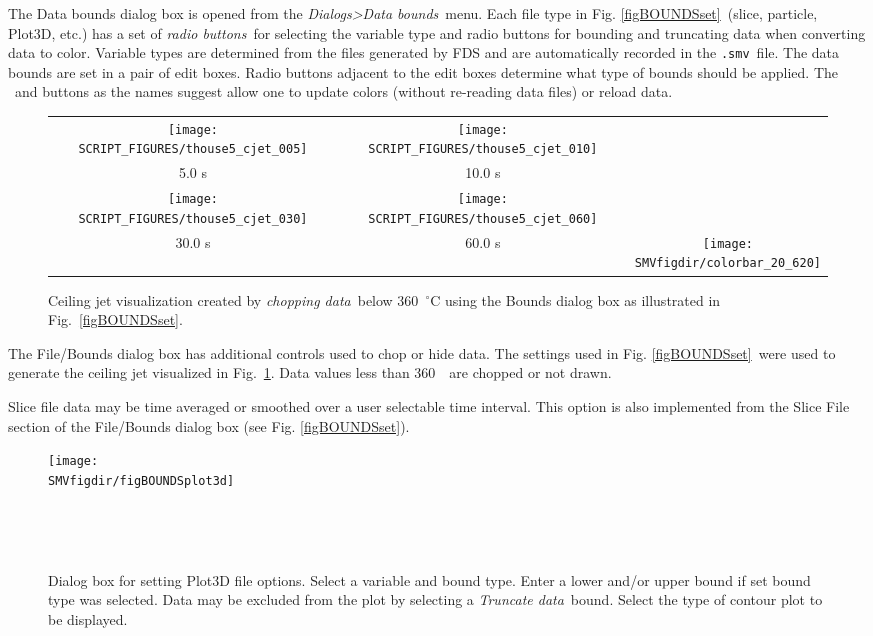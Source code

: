\documentclass[11pt,twoside]{book}
\newcommand{\figheightAbar}{2.2in}
\newcommand{\frameit}[1]{\fbox{\tt #1}}
\begin{document}
The Data bounds dialog box is opened from the {\em
Dialogs>Data bounds}\ menu. Each file type in Fig. \ref{figBOUNDSset}\
(slice, particle, Plot3D, etc.) has a set of {\em radio buttons}\
for selecting the variable type and radio buttons for bounding and truncating
data when converting data to color. Variable types are determined from the files generated
by FDS and are automatically recorded in the {\tt .smv}\ file. The
data bounds are set in a pair of edit boxes. Radio buttons
adjacent to the edit boxes determine what type of bounds should be
applied.
The \frameit{Update Colors}\ and \frameit{Reload Data} buttons
as the names suggest allow one to update colors (without re-reading data files) or reload data.

\begin{figure}[bph]
\begin{center}
\begin{tabular}{ccc}
\texttt{[image: SCRIPT\_FIGURES/thouse5\_cjet\_005]}&
\texttt{[image: SCRIPT\_FIGURES/thouse5\_cjet\_010]}\\
5.0 s&10.0 s\\
\texttt{[image: SCRIPT\_FIGURES/thouse5\_cjet\_030]}&
\texttt{[image: SCRIPT\_FIGURES/thouse5\_cjet\_060]}&\\
30.0 s&60.0 s
&\raisebox{0.0ex}[0pt]{\texttt{[image: \\SMVfigdir/colorbar\_20\_620]}}\\
\end{tabular}
\caption [Ceiling Jet Visualization.] {   Ceiling jet
visualization created by {\em chopping data}\ below 360~$^\circ$C
using the Bounds dialog box as illustrated in
Fig.~\ref{figBOUNDSset}. }
\label{figceilingjet}%
\end{center}
\end{figure}

The File/Bounds dialog box has additional controls used to chop or
hide data. The settings used in Fig. \ref{figBOUNDSset}\ were
used to generate the ceiling jet visualized in
Fig.~\ref{figceilingjet}. Data values less than 360~\degC\ are
chopped or not drawn.

Slice file data may be time averaged or smoothed over a user
selectable time interval.  This option is also implemented from
the Slice File section of the File/Bounds dialog box (see
Fig. \ref{figBOUNDSset}).

\begin{figure}[bph]
\centerline{
\texttt{[image: \\SMVfigdir/figBOUNDSplot3d]}
}\ \caption[Dialog box for setting Plot3D file
options.] {Dialog box for setting Plot3D file
options. Select a variable and bound type. Enter a lower
and/or upper bound if set bound type was selected.  Data may be excluded from the plot by
selecting a {\em Truncate data}\ bound. Select the type of contour
plot to be displayed.}\ \label{figBOUNDSplot3d}
\end{figure}
\end{document}
